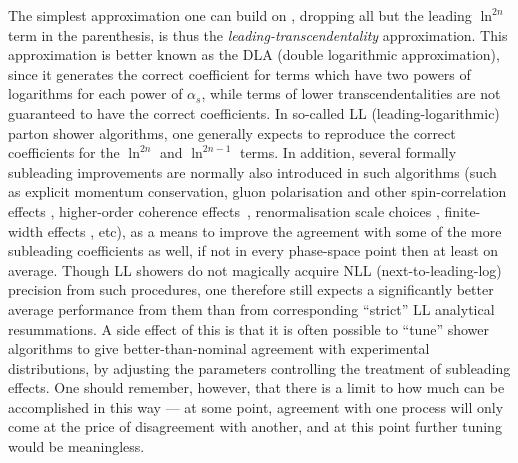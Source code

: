 The simplest approximation one can build on , dropping
all but the leading $\ln^{2n}$ term in the parenthesis, 
is thus the \emph{leading-transcendentality} approximation. This
approximation is better known as 
the DLA (double logarithmic approximation), since it generates the
correct coefficient for terms which have two powers of logarithms for
each power of $\alpha_s$, while terms of lower transcendentalities are not
guaranteed to have the correct coefficients. In so-called LL
(leading-logarithmic) parton shower algorithms, one generally expects
to reproduce the correct coefficients for the $\ln^{2n}$ and
$\ln^{2n-1}$ terms. In addition, several formally subleading
improvements are normally also introduced in such algorithms 
(such as explicit momentum
conservation, gluon polarisation and other 
%
spin-correlation effects
\cite{Collins:1987cp,Knowles:1988vs,Richardson:2001df},
higher-order coherence effects~\cite{Marchesini:1983bm}, 
renormalisation scale choices
\cite{Catani:1990rr}, finite-width effects \cite{Gigg:2008yc}, etc), 
as a means to improve the agreement
with some of the more subleading coefficients as well, if not in every
phase-space point then at least on average. 
%
Though LL showers do not magically acquire NLL
(next-to-leading-log) precision from such procedures, one therefore
still expects a significantly better average performance from them 
than from corresponding ``strict'' LL analytical resummations. A side
effect of this is that it is often possible to ``tune'' shower
algorithms to give 
better-than-nominal agreement with experimental distributions, by
adjusting the parameters controlling the treatment of subleading
effects. One should remember, however, that there is a limit to how
much can be accomplished in this way --- at some point, agreement with
one process will only come at the price of disagreement with another,
and at this point further tuning would be meaningless.  

